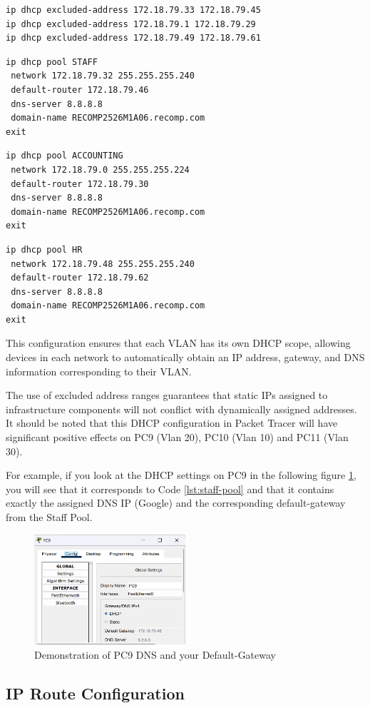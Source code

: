 \begin{lstlisting}[caption={Exclusion of static addresses already defined to avoid errors}, label={lst:errors}]
ip dhcp excluded-address 172.18.79.33 172.18.79.45
ip dhcp excluded-address 172.18.79.1 172.18.79.29
ip dhcp excluded-address 172.18.79.49 172.18.79.61
\end{lstlisting}

\begin{lstlisting}[caption={Creation of a DHCP pool called STAFF}, label={lst:staff-pool}]
ip dhcp pool STAFF
 network 172.18.79.32 255.255.255.240
 default-router 172.18.79.46
 dns-server 8.8.8.8
 domain-name RECOMP2526M1A06.recomp.com 
exit
\end{lstlisting}

\begin{lstlisting}[caption={Creation of a DHCP pool called ACCOUNTING}, label={lst:ACCOUNTING-pool}]
ip dhcp pool ACCOUNTING
 network 172.18.79.0 255.255.255.224
 default-router 172.18.79.30
 dns-server 8.8.8.8
 domain-name RECOMP2526M1A06.recomp.com
exit
\end{lstlisting}

\begin{lstlisting}[caption={Creation of a DHCP pool called HR}, label={lst:HR-pool}]
ip dhcp pool HR
 network 172.18.79.48 255.255.255.240
 default-router 172.18.79.62
 dns-server 8.8.8.8
 domain-name RECOMP2526M1A06.recomp.com
exit
\end{lstlisting}

This configuration ensures that each VLAN has its own DHCP scope, allowing devices in each network to automatically obtain an IP address, gateway, and DNS information corresponding to their VLAN. 


The use of excluded address ranges guarantees that static IPs assigned to infrastructure components will not conflict with dynamically assigned addresses.
It should be noted that this DHCP configuration in Packet Tracer will have significant positive effects on PC9 (Vlan 20), PC10 (Vlan 10) and PC11 (Vlan 30).

\newpage
For example, if you look at the DHCP settings on PC9 in the following figure \ref{fig:munich_pc9}, you will see that it corresponds to Code \ref{lst:staff-pool} and that it contains exactly the assigned DNS IP (Google) and the corresponding default-gateway from the Staff Pool.

\begin{figure}[!h]
\centering
\includegraphics[width=0.5\textwidth]{figures/pc9_conf_example.png}
\caption{\label{fig:munich_pc9}Demonstration of PC9 DNS and your Default-Gateway}
\end{figure}

\subsection{IP Route Configuration}

